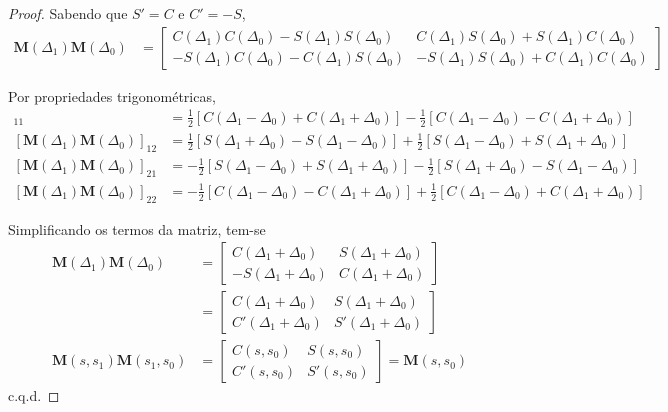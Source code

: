 \begin{proof}
	Sabendo que $S'=C$ e $C'=-S$,
	\begin{align*}
        \boldsymbol{M}(\Delta_1)\boldsymbol{M}(\Delta_0) &= \begin{bmatrix}
        C(\Delta_1)C(\Delta_0)-S(\Delta_1)S(\Delta_0) & C(\Delta_1)S(\Delta_0) + S(\Delta_1)C(\Delta_0)\\
        -S(\Delta_1)C(\Delta_0)-C(\Delta_1)S(\Delta_0) & -S(\Delta_1)S(\Delta_0) + C(\Delta_1)C(\Delta_0)
        \end{bmatrix}
	\end{align*}
	
	Por propriedades trigonométricas,
	\begin{align*}
        [\boldsymbol{M}(\Delta_1)\boldsymbol{M}(\Delta_0)]_{11} &= \frac{1}{2}[C(\Delta_1-\Delta_0)+C(\Delta_1+\Delta_0)] - \frac{1}{2}[C(\Delta_1-\Delta_0)-C(\Delta_1+\Delta_0)]\\
        [\boldsymbol{M}(\Delta_1)\boldsymbol{M}(\Delta_0)]_{12} &= \frac{1}{2}[S(\Delta_1+\Delta_0)-S(\Delta_1-\Delta_0)] + \frac{1}{2}[S(\Delta_1-\Delta_0)+S(\Delta_1+\Delta_0)]\\
        [\boldsymbol{M}(\Delta_1)\boldsymbol{M}(\Delta_0)]_{21} &= -\frac{1}{2}[S(\Delta_1-\Delta_0)+S(\Delta_1+\Delta_0)] - \frac{1}{2}[S(\Delta_1+\Delta_0)-S(\Delta_1-\Delta_0)]\\
        [\boldsymbol{M}(\Delta_1)\boldsymbol{M}(\Delta_0)]_{22} &= -\frac{1}{2}[C(\Delta_1-\Delta_0)-C(\Delta_1+\Delta_0)] + \frac{1}{2}[C(\Delta_1-\Delta_0)+C(\Delta_1+\Delta_0)]
	\end{align*}
	
	Simplificando os termos da matriz, tem-se
	\begin{align*}
        \boldsymbol{M}(\Delta_1)\boldsymbol{M}(\Delta_0) &= \begin{bmatrix}
        C(\Delta_1+\Delta_0) & S(\Delta_1+\Delta_0)\\
        -S(\Delta_1+\Delta_0) & C(\Delta_1+\Delta_0)
        \end{bmatrix}\\
        &= \begin{bmatrix}
            C(\Delta_1+\Delta_0) & S(\Delta_1+\Delta_0)\\
            C'(\Delta_1+\Delta_0) & S'(\Delta_1+\Delta_0)
            \end{bmatrix}\\
        \boldsymbol{M}(s,s_1)\boldsymbol{M}(s_1,s_0)&= \begin{bmatrix}
            C(s,s_0) & S(s,s_0)\\
            C'(s,s_0) & S'(s,s_0)
            \end{bmatrix} = \boldsymbol{M}(s,s_0) 
	\end{align*}
	c.q.d.
\end{proof}
	
